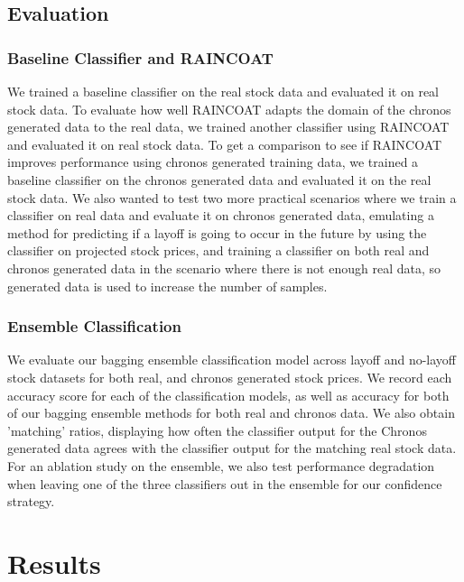 \documentclass[10pt]{article}
\begin{document}
\subsection{Evaluation}
\subsubsection{Baseline Classifier and RAINCOAT}
We trained a baseline classifier on the real stock data and evaluated 
it on real stock data. To evaluate how well RAINCOAT adapts the domain 
of the chronos generated data to the real data, we trained another 
classifier using RAINCOAT and evaluated it on real stock data. To get 
a comparison to see if RAINCOAT improves performance using chronos 
generated training data, we trained a baseline classifier on the 
chronos generated data and evaluated it on the real stock data. We 
also wanted to test two more practical scenarios where we train a 
classifier on real data and evaluate it on chronos generated data, 
emulating a method for predicting if a layoff is going to occur in 
the future by using the classifier on projected stock prices, and 
training a classifier on both real and chronos generated data in 
the scenario where there is not enough real data, so generated data 
is used to increase the number of samples.  

\subsubsection{Ensemble Classification}
We evaluate our bagging ensemble classification model across layoff 
and no-layoff stock datasets for both real, and chronos generated 
stock prices. We record each accuracy score for each of the 
classification models, as well as accuracy for both of our bagging 
ensemble methods for both real and chronos data. We also obtain 
'matching' ratios, displaying how often the classifier output for 
the Chronos generated data agrees with the classifier output for 
the matching real stock data.  
\\
For an ablation study on the ensemble, we also test performance 
degradation when leaving one of the three classifiers out in the 
ensemble for our confidence strategy.

%
% 
\section{Results}
\end{document}
